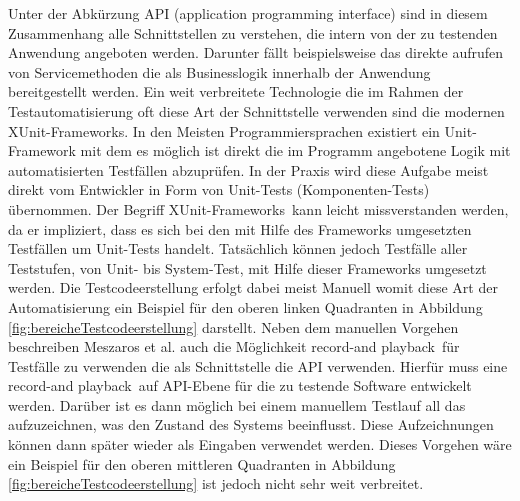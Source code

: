 Unter der Abkürzung API (application programming interface) sind in diesem Zusammenhang alle Schnittstellen zu verstehen, die intern von der zu testenden Anwendung angeboten werden. Darunter fällt beispielsweise das direkte aufrufen von Servicemethoden die als Businesslogik innerhalb der Anwendung bereitgestellt werden.
Ein weit verbreitete Technologie die im Rahmen der Testautomatisierung oft diese Art der Schnittstelle verwenden sind die modernen \grq XUnit-Frameworks\grq. In den Meisten Programmiersprachen existiert ein Unit-Framework mit dem es möglich ist direkt die im Programm angebotene Logik mit automatisierten Testfällen abzuprüfen. In der Praxis wird diese Aufgabe meist direkt vom Entwickler in Form von Unit-Tests (Komponenten-Tests) übernommen. Der Begriff \grq XUnit-Frameworks\grq\ kann leicht missverstanden werden, da er impliziert, dass es sich bei den mit Hilfe des Frameworks umgesetzten Testfällen um Unit-Tests handelt. Tatsächlich können jedoch Testfälle aller Teststufen, von Unit- bis System-Test, mit Hilfe dieser Frameworks umgesetzt werden.
Die Testcodeerstellung erfolgt dabei meist Manuell womit diese Art der Automatisierung ein Beispiel für den oberen linken Quadranten in Abbildung \ref{fig:bereicheTestcodeerstellung} darstellt.
Neben dem manuellen Vorgehen beschreiben Meszaros et al. \cite{meszaros_agile_2003} auch die Möglichkeit \grq record-and playback\grq\ für Testfälle zu verwenden die als Schnittstelle die API verwenden.
Hierfür muss eine \grq record-and playback\grq\ auf API-Ebene für die zu testende Software entwickelt werden. Darüber ist es dann möglich bei einem manuellem Testlauf all das aufzuzeichnen, was den Zustand des Systems beeinflusst. Diese Aufzeichnungen können dann später wieder als Eingaben verwendet werden. Dieses Vorgehen wäre ein Beispiel für den oberen mittleren Quadranten in Abbildung \ref{fig:bereicheTestcodeerstellung} ist jedoch nicht sehr weit verbreitet.

